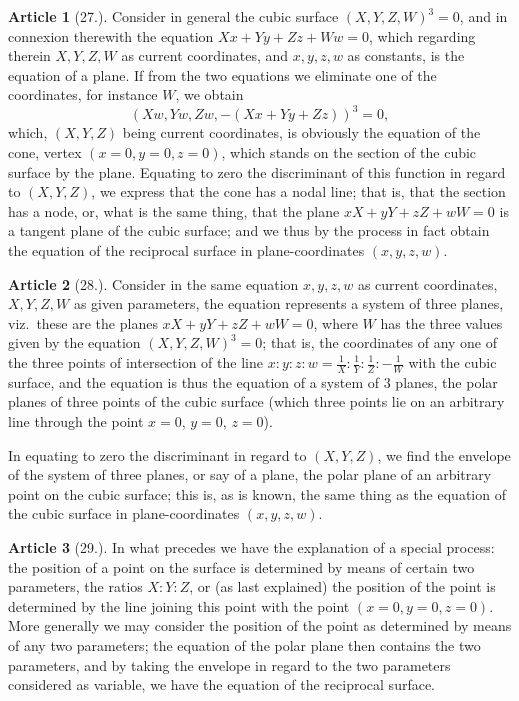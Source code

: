 \documentclass[11pt,a4paper]{article}
\theoremstyle{definition}
\newtheorem{art}{Article}
\begin{document}
\begin{art}[27.]
Consider in general the cubic surface $(\!\!X, Y, Z, W\!\!)^3 = 0$, and in connexion therewith the equation $Xx + Yy + Zz + Ww = 0$, which regarding therein $X, Y, Z, W$ as current coordinates, and $x, y, z, w$ as constants, is the equation of a plane. If from the two equations we eliminate one of the coordinates, for instance $W$, we obtain
\[
(\!\!Xw, Yw, Zw, -(Xx + Yy + Zz)\!\!)^3 = 0,
\]
which, $(X, Y, Z)$ being current coordinates, is obviously the equation of the cone, vertex $(x = 0, y = 0, z = 0)$, which stands on the section of the cubic surface by the plane. Equating to zero the discriminant of this function in regard to $(X, Y, Z)$, we express that the cone has a nodal line; that is, that the section has a node, or, what is the same thing, that the plane $xX + yY + zZ + wW = 0$ is a tangent plane of the cubic surface; and we thus by the process in fact obtain the equation of the reciprocal surface in plane-coordinates $(x, y, z, w)$.
\end{art}

\begin{art}[28.]
Consider in the same equation $x, y, z, w$ as current coordinates, $X, Y, Z, W$ as given parameters, the equation represents a system of three planes, viz.\ these are the planes $xX + yY + zZ + wW = 0$, where $W$ has the three values given by the equation $(\!\!X, Y, Z, W\!\!)^3 = 0$; that is, the coordinates of any one of the three points of intersection of the line $x : y : z : w = \frac{1}{X} : \frac{1}{Y} : \frac{1}{Z} : -\frac{1}{W}$ with the cubic surface, and the equation is thus the equation of a system of 3 planes, the polar planes of three points of the cubic surface (which three points lie on an arbitrary line through the point $x = 0$, $y = 0$, $z = 0$).

In equating to zero the discriminant in regard to $(X, Y, Z)$, we find the envelope of the system of three planes, or say of a plane, the polar plane of an arbitrary point on the cubic surface; this is, as is known, the same thing as the equation of the cubic surface in plane-coordinates $(x, y, z, w)$.
\end{art}

\begin{art}[29.]
In what precedes we have the explanation of a special process: the position of a point on the surface is determined by means of certain two parameters, the ratios $X : Y : Z$, or (as last explained) the position of the point is determined by the line joining this point with the point $(x = 0, y = 0, z = 0)$. More generally we may consider the position of the point as determined by means of any two parameters; the equation of the polar plane then contains the two parameters, and by taking the envelope in regard to the two parameters considered as variable, we have the equation of the reciprocal surface.
\end{art}
\end{document}
